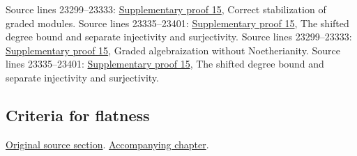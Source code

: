 \begin{AlgebraSourceRoutes}
 Source lines 23299--23333: \hyperlink{algebra_graded_completion_notes_20260927}{Supplementary proof 15}, Correct stabilization of graded modules.
 Source lines 23335--23401: \hyperlink{algebra_graded_completion_notes_20260927}{Supplementary proof 15}, The shifted degree bound and separate injectivity and surjectivity.
 Source lines 23299--23333: \hyperlink{algebra_graded_completion_notes_20260927}{Supplementary proof 15}, Graded algebraization without Noetherianity.
 Source lines 23335--23401: \hyperlink{algebra_graded_completion_notes_20260927}{Supplementary proof 15}, The shifted degree bound and separate injectivity and surjectivity.
\end{AlgebraSourceRoutes}

\subsection{Criteria for flatness}
\hypertarget{algebra-source-section-criteria-flatness}{}
\noindent\href{https://github.com/stacks/stacks-project/blob/a04446e57ec1fbc252a871afcec7752fb2807b14/algebra.tex\#L23415}{Original source section}. \href{algebra.pdf\#nameddest=section-criteria-flatness}{Accompanying chapter}.

